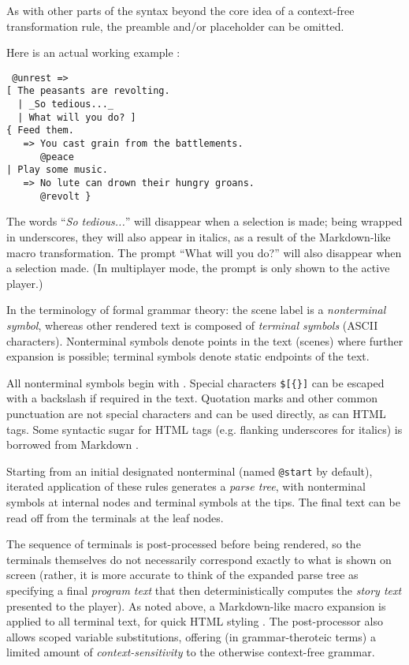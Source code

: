 \documentclass{acm_proc_article-sp}
\begin{document}
As with other parts of the syntax beyond the core idea of a context-free transformation rule,
the preamble and/or placeholder can be omitted.

Here is an actual working example \cite{ChoiceOfGamesBlog}:
\begin{verbatim}
 @unrest =>
[ The peasants are revolting. 
  | _So tedious..._ 
  | What will you do? ] 
{ Feed them.
   => You cast grain from the battlements.
      @peace
| Play some music.
   => No lute can drown their hungry groans.
      @revolt }
\end{verbatim}

The words ``{\em So tedious...}'' will disappear when a selection is made; being wrapped in underscores, they will also appear in italics, as a result of the Markdown-like macro transformation.
The prompt ``What will you do?'' will also disappear when a selection made.
(In multiplayer mode, the prompt is only shown to the active player.)



In the terminology of formal grammar theory: the scene label {\tt \@scene} is a {\em nonterminal symbol},
whereas other rendered text is composed of {\em terminal symbols} (ASCII characters).
Nonterminal symbols denote points in the text (scenes) where further expansion is possible;
terminal symbols denote static endpoints of the text.

All nonterminal symbols begin with {\tt \@}.
Special characters {\tt \$\@[\{\}]} can be escaped with a backslash if required in the text.
Quotation marks and other common punctuation are not special characters and can be used directly, as can HTML tags.
Some syntactic sugar for HTML tags (e.g. flanking underscores for italics) is borrowed from Markdown \cite{Markdown}.

Starting from an initial designated nonterminal (named {\tt @start} by default),
iterated application of these rules generates a {\em parse tree},
with nonterminal symbols at internal nodes and terminal symbols at the tips.
The final text can be read off from the terminals at the leaf nodes.

The sequence of terminals is post-processed before being rendered,
so the terminals themselves do not necessarily correspond exactly to what is shown on screen
(rather, it is more accurate to think of the expanded parse tree as specifying a final {\em program text}
that then deterministically computes the {\em story text} presented to the player).
As noted above, a Markdown-like macro expansion is applied to all terminal text, for quick HTML styling \cite{Markdown}.
The post-processor also allows scoped variable substitutions,
offering (in grammar-theroteic terms) a limited amount of {\em context-sensitivity}
to the otherwise context-free grammar.
\end{document}

